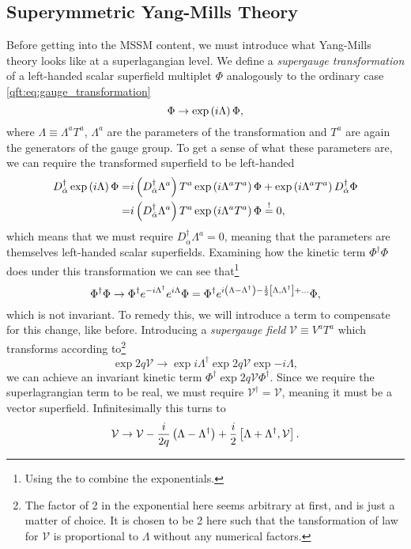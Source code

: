 \documentclass[../main.tex]{subfiles}
\begin{document}
\subsection{Superymmetric Yang-Mills Theory}
Before getting into the MSSM content, we must introduce what Yang-Mills theory
looks like at a superlagangian level. We define a \textit{supergauge
    transformation} of a left-handed scalar superfield multiplet \(\Phi\)
analogously to the ordinary case \cref{qft:eq:gauge_transformation}
\begin{equation}
    \label{susy:eq:supergauge_transformation}
    \Phi \to \operatorname{exp}\left(i \Lambda\right) \Phi,
\end{equation}
where \(\Lambda \equiv \Lambda^a T^a\), \(\Lambda^a\) are the parameters of the transformation and \(T^a\) are again the generators of the gauge group.
To get a sense of what these parameters are, we can require the transformed superfield to be left-handed
\begin{align*}
    D_{\dot{\alpha}}^\dagger \operatorname{exp}\left(i\Lambda\right) \Phi = & i\left(D_{\dot{\alpha}}^\dagger \Lambda^a\right) T^a \operatorname{exp}\left(i\Lambda^a T^a\right) \Phi + \operatorname{exp}\left(i\Lambda^a T^a\right) D_{\dot{\alpha}}^\dagger \Phi \\
    =                                                  & i\left(D_{\dot{\alpha}}^\dagger \Lambda^a\right) T^a \operatorname{exp}\left(i\Lambda^a T^a\right) \Phi \overset{!}{=} 0,
\end{align*}
which means that we must require \(D_{\dot{\alpha}}^\dagger \Lambda^a = 0\), meaning that the parameters are themselves left-handed scalar superfields.
Examining how the kinetic term \(\Phi^\dagger \Phi\) does under this transformation we can see that\footnote{Using the  to combine the exponentials.}
\begin{equation}
    \Phi^\dagger \Phi \to \Phi^\dagger e^{-i\Lambda^\dagger} e^{i\Lambda} \Phi = \Phi^\dagger e^{i\left(\Lambda - \Lambda^\dagger\right) - \frac{1}{2} \left[\Lambda,\Lambda^\dagger\right] + \ldots} \Phi,
\end{equation}
which is not invariant. To remedy this, we will introduce a term to compensate for this change, like before.
Introducing a \textit{supergauge field} \(\mathcal{V} \equiv V^a T^a\) which transforms according to\footnote{The factor of 2 in the exponential here seems arbitrary at first, and is just a matter of choice. It is chosen to be 2 here such that the tansformation of law for \(\mathcal{V}\) is proportional to \(\Lambda\) without any numerical factors.}
\begin{equation}
    \exp{2q\mathcal{V}} \to \exp{i\Lambda^\dagger} \exp{2q\mathcal{V}} \exp{-i\Lambda},
\end{equation}
we can achieve an invariant kinetic term \(\Phi^\dagger \exp{2q\mathcal{V}} \Phi^\dagger\).
Since we require the superlagrangian term to be real, we must require \(\mathcal{V}^\dagger = \mathcal{V}\),
meaning it must be a vector superfield.
Infinitesimally this turns to\needcite{}
\begin{equation}
    \mathcal{V} \to \mathcal{V} - \frac{i}{2q} \left(\Lambda - \Lambda^\dagger\right) + \frac{i}{2} \left[\Lambda + \Lambda^\dagger,\mathcal{V}\right].
\end{equation}
\end{document}
